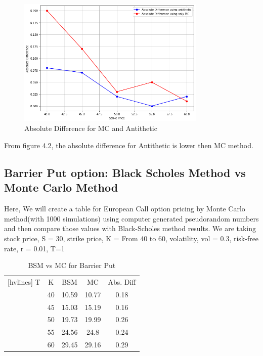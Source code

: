 \begin{figure}[H]
	\begin{center}
		\includegraphics[width=0.8\textwidth]{Absolute_Difference_for_MC_and_Antithetic}
	\end{center}
	\caption{Absolute Difference for MC and Antithetic}
\end{figure}

\noindent From figure 4.2, the absolute difference for Antithetic is lower then MC method.  

\subsection{Barrier Put option: Black Scholes Method vs Monte Carlo Method}

Here, We will create a table for European Call option pricing by Monte Carlo method(with 1000
simulations) using computer generated pseudorandom numbers and then compare those
values with Black-Scholes method results. We are taking stock price, S = 30, strike price, K = From 40 to 60, volatility, vol = 0.3, risk-free rate, r = 0.01, T=1


\begin{table} [H]
\begin{center}
	\begin{NiceTabular}{|c|c|c|c|c|}[hvlines]
		 T & K & BSM & MC & Abs. Diff \\ 
		& 40 &   10.59 &   10.77 &   0.18 \\
		& 45 &   15.03 &   15.19 &   0.16 \\
		& 50 &   19.73 &   19.99 &   0.26 \\ 
		& 55 &   24.56 &   24.8 &   0.24 \\
		& 60 &   29.45 &   29.16 &   0.29 \\
	\end{NiceTabular}
\end{center}
\caption{BSM vs MC for Barrier Put}
\end{table}


